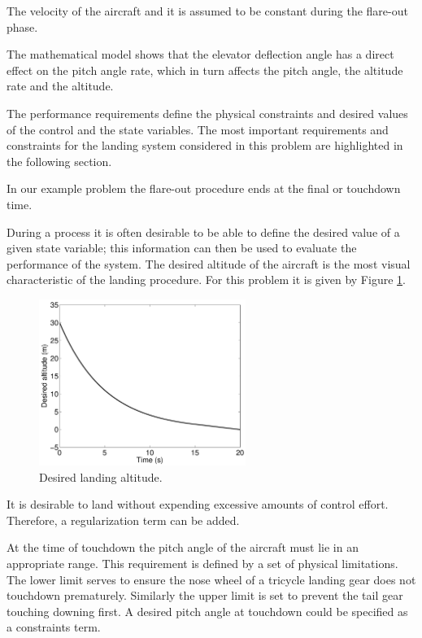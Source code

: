The velocity of the aircraft and it is assumed to be constant during the flare-out phase. 

The mathematical model shows that the elevator deflection angle
has a direct effect on the pitch angle rate,
which in turn affects the pitch angle, the altitude
rate and the altitude.

The performance requirements define the physical constraints and
desired values of the control and the state variables. The most
important requirements and constraints for the landing system
considered in this problem are highlighted in the following section.

In our example problem the flare-out procedure ends at the final or touchdown time. 

During a process it is often desirable to be able to define the
desired value of a given state variable; this information can then
be used to evaluate the performance of the system. The desired
altitude of the aircraft is the most visual characteristic of the
landing procedure. For this problem it is given by Figure
\ref{DesiredAltitudeFigure}.

\begin{figure}[h!]
\begin{center}
\includegraphics[width=0.6\textwidth]{optimal_control/target_altitude_aircraft_landing}
\caption{Desired landing altitude.}\label{DesiredAltitudeFigure}
\end{center}
\end{figure}

It is desirable to land without expending excessive amounts of
control effort. Therefore, a regularization term can be added. 

At the time of touchdown the pitch angle of the aircraft must lie
in an appropriate range. This requirement is
defined by a set of physical limitations. The lower limit serves
to ensure the nose wheel of a tricycle landing gear does not
touchdown prematurely. Similarly the upper limit is set to prevent
the tail gear touching downing first. A desired pitch angle at
touchdown could be specified as a constraints term. 




